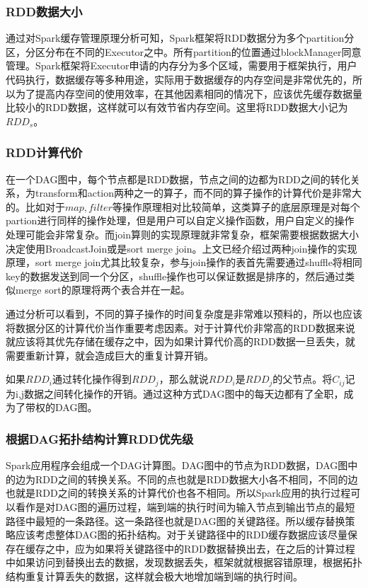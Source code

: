 \subsubsection{RDD数据大小}

通过对Spark缓存管理原理分析可知，Spark框架将RDD数据分为多个partition分区，分区分布在不同的Executor之中。所有partition的位置通过blockManager同意管理。Spark框架将Executor申请的内存分为多个区域，需要用于框架执行，用户代码执行，数据缓存等多种用途，实际用于数据缓存的内存空间是非常优先的，所以为了提高内存空间的使用效率，在其他因素相同的情况下，应该优先缓存数据量比较小的RDD数据，这样就可以有效节省内存空间。这里将RDD数据大小记为$RDD_s$。

\subsubsection{RDD计算代价}

在一个DAG图中，每个节点都是RDD数据，节点之间的边都为RDD之间的转化关系，为transform和action两种之一的算子，而不同的算子操作的计算代价是非常大的。比如对于$map,filter$等操作原理相对比较简单，这类算子的底层原理是对每个partion进行同样的操作处理，但是用户可以自定义操作函数，用户自定义的操作处理可能会非常复杂。而join算则的实现原理就非常复杂，框架需要根据数据大小决定使用BroadcastJoin或是sort merge join。上文已经介绍过两种join操作的实现原理，sort merge join尤其比较复杂，参与join操作的表首先需要通过shuffle将相同key的数据发送到同一个分区，shuffle操作也可以保证数据是排序的，然后通过类似merge sort的原理将两个表合并在一起。

通过分析可以看到，不同的算子操作的时间复杂度是非常难以预料的，所以也应该将数据分区的计算代价当作重要考虑因素。对于计算代价非常高的RDD数据来说就应该将其优先存储在缓存之中，因为如果计算代价高的RDD数据一旦丢失，就需要重新计算，就会造成巨大的重复计算开销。

如果$RDD_i$通过转化操作得到$RDD_j$，那么就说$RDD_i$是$RDD_j$的父节点。将$C_{ij}$记为i,j数据之间转化操作的开销。通过这种方式DAG图中的每天边都有了全职，成为了带权的DAG图。

\subsubsection{根据DAG拓扑结构计算RDD优先级}

Spark应用程序会组成一个DAG计算图。DAG图中的节点为RDD数据，DAG图中的边为RDD之间的转换关系。不同的点也就是RDD数据大小各不相同，不同的边也就是RDD之间的转换关系的计算代价也各不相同。所以Spark应用的执行过程可以看作是对DAG图的遍历过程，端到端的执行时间为输入节点到输出节点的最短路径中最短的一条路径。这一条路径也就是DAG图的关键路径。所以缓存替换策略应该考虑整体DAG图的拓扑结构。对于关键路径中的RDD缓存数据应该尽量保存在缓存之中，应为如果将关键路径中的RDD数据替换出去，在之后的计算过程中如果访问到替换出去的数据，发现数据丢失，框架就就根据容错原理，根据拓扑结构重复计算丢失的数据，这样就会极大地增加端到端的执行时间。

